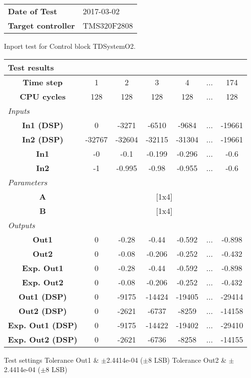 \begin{tabular}{l l}
\textbf{Date of Test} & 2017-03-02 \tabularnewline
\textbf{Target controller} & TMS320F2808 \tabularnewline
\end{tabular}
\vspace{1ex}
Inport test for Control block TDSystemO2.

\vspace{1em}
\begin{tabularx}{\textwidth}{|c|c|c|c|c|>{\centering\arraybackslash}X|c|}
\hline
\multicolumn{7}{|l|}{\cellcolor[gray]{0.8}\textbf{Test results}} \tabularnewline \hline
\textbf{Time step} & 1 & 2 & 3 & 4 & ... & 174 \tabularnewline \hline
\textbf{CPU cycles} & 128 & 128 & 128 & 128 & ... & 128 \tabularnewline \hline
\multicolumn{7}{|l|}{\cellcolor[gray]{0.9}\textit{Inputs}} \tabularnewline \hline
\textbf{In1 (DSP)} & 0 & -3271 & -6510 & -9684 & ... & -19661 \tabularnewline \hline
\textbf{In2 (DSP)} & -32767 & -32604 & -32115 & -31304 & ... & -19661 \tabularnewline \hline
\textbf{In1} & -0 & -0.1 & -0.199 & -0.296 & ... & -0.6 \tabularnewline \hline
\textbf{In2} & -1 & -0.995 & -0.98 & -0.955 & ... & -0.6 \tabularnewline \hline
\multicolumn{7}{|l|}{\cellcolor[gray]{0.9}\textit{Parameters}} \tabularnewline \hline
\textbf{A} & \multicolumn{6}{c|}{[1x4]} \tabularnewline \hline
\textbf{B} & \multicolumn{6}{c|}{[1x4]} \tabularnewline \hline
\multicolumn{7}{|l|}{\cellcolor[gray]{0.9}\textit{Outputs}} \tabularnewline \hline
\textbf{Out1} & 0 & -0.28 & -0.44 & -0.592 & ... & -0.898 \tabularnewline \hline
\textbf{Out2} & 0 & -0.08 & -0.206 & -0.252 & ... & -0.432 \tabularnewline \hline
\textbf{Exp. Out1} & 0 & -0.28 & -0.44 & -0.592 & ... & -0.898 \tabularnewline \hline
\textbf{Exp. Out2} & 0 & -0.08 & -0.206 & -0.252 & ... & -0.432 \tabularnewline \hline
\textbf{Out1 (DSP)} & 0 & -9175 & -14424 & -19405 & ... & -29414 \tabularnewline \hline
\textbf{Out2 (DSP)} & 0 & -2621 & -6737 & -8259 & ... & -14158 \tabularnewline \hline
\textbf{Exp. Out1 (DSP)} & 0 & -9175 & -14422 & -19402 & ... & -29410 \tabularnewline \hline
\textbf{Exp. Out2 (DSP)} & 0 & -2621 & -6736 & -8258 & ... & -14155 \tabularnewline \hline
\end{tabularx}
\vspace{1ex}

\begin{XtoCtabular}{Test settings}
Tolerance Out1 & $\pm$2.4414e-04 ($\pm$8 LSB) \tabularnewline \hline
Tolerance Out2 & $\pm$2.4414e-04 ($\pm$8 LSB) \tabularnewline \hline
\end{XtoCtabular}

